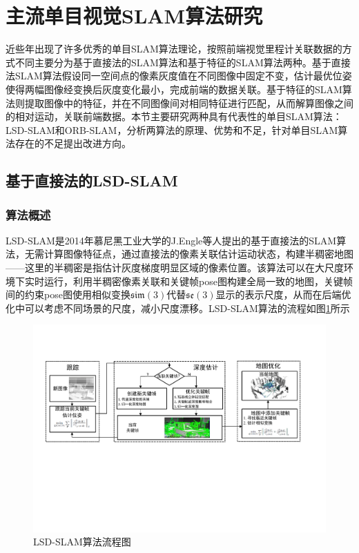 \section{主流单目视觉SLAM算法研究}
近些年出现了许多优秀的单目SLAM算法理论，按照前端视觉里程计关联数据的方式不同主要分为基于直接法的SLAM算法和基于特征的SLAM算法两种。基于直接法SLAM算法假设同一空间点的像素灰度值在不同图像中固定不变，估计最优位姿使得两幅图像经变换后灰度变化最小，完成前端的数据关联。基于特征的SLAM算法则提取图像中的特征，并在不同图像间对相同特征进行匹配，从而解算图像之间的相对运动，关联前端数据。本节主要研究两种具有代表性的单目SLAM算法：LSD-SLAM和ORB-SLAM，分析两算法的原理、优势和不足，针对单目SLAM算法存在的不足提出改进方向。

\subsection{基于直接法的LSD-SLAM}


\subsubsection*{算法概述}
LSD-SLAM是2014年慕尼黑工业大学的J.Engle等人提出的基于直接法的SLAM算法，无需计算图像特征点，通过直接法的像素关联估计运动状态，构建半稠密地图——这里的半稠密是指估计灰度梯度明显区域的像素位置。该算法可以在大尺度环境下实时运行，利用半稠密像素关联和关键帧pose图构建全局一致的地图，关键帧间的约束pose图使用相似变换$\mathfrak{sim}(3)$代替$\mathfrak{se}(3)$显示的表示尺度，从而在后端优化中可以考虑不同场景的尺度，减小尺度漂移。LSD-SLAM算法的流程如图\ref{fig3.4}所示

\begin{figure}
\centering
\includegraphics[scale=0.5,angle=-90]{figures/Fig3-4.pdf}
\caption{LSD-SLAM算法流程图\upcite{[1.21]}}
\label{fig3.4}
\end{figure}


